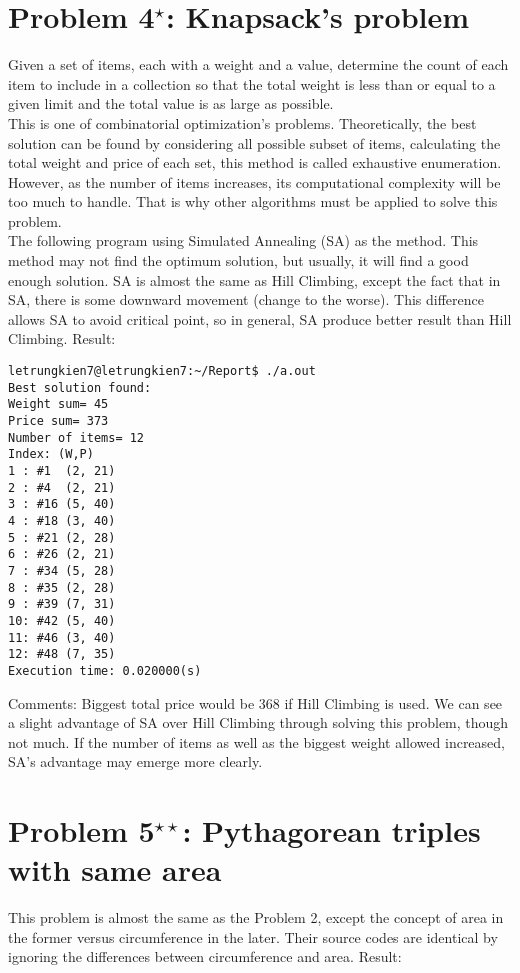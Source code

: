 \documentclass[11pt]{article}
\begin{document}
\section{Problem 4${}^{\star}$: \normalsize Knapsack's problem}
\indent Given a set of items, each with a weight and a value, determine the count of each item to include in a collection so that the total weight is less than or equal to a given limit and the total value is as large as possible.\\
\indent This is one of combinatorial optimization's problems. Theoretically, the best solution can be found by considering all possible subset of items, calculating the total weight and price of each set, this method is called exhaustive enumeration. However, as  the number of items increases, its computational complexity will be too much to handle. That is why other algorithms must be applied to solve this problem.\\
\indent The following program using Simulated Annealing (SA) as the method.  This method may not find the optimum solution, but usually, it will find a good enough solution. SA is almost the same as Hill Climbing, except the fact that in SA, there is some downward movement (change to the worse). This difference allows SA to avoid critical point, so in general, SA produce better result than Hill Climbing. Result:
\begin{verbatim}
letrungkien7@letrungkien7:~/Report$ ./a.out
Best solution found:
Weight sum= 45
Price sum= 373
Number of items= 12
Index: (W,P)
1 : #1  (2, 21)
2 : #4  (2, 21)
3 : #16 (5, 40)
4 : #18 (3, 40)
5 : #21 (2, 28)
6 : #26 (2, 21)
7 : #34 (5, 28)
8 : #35 (2, 28)
9 : #39 (7, 31)
10: #42 (5, 40)
11: #46 (3, 40)
12: #48 (7, 35)
Execution time: 0.020000(s)
\end{verbatim}
Comments: Biggest total price would be 368 if Hill Climbing is used. We can see a slight advantage of SA over Hill Climbing through solving this problem, though not much. If the number of items as well as the biggest weight allowed increased, SA's advantage may emerge more clearly.
\newpage
\section{Problem 5${}^{\star\star}$: \normalsize Pythagorean triples with same area}
\indent This problem is almost the same as the Problem 2, except the concept of area in the former versus circumference in the later. Their source codes are identical by ignoring the differences between circumference and area. Result:
%
\end{document}
